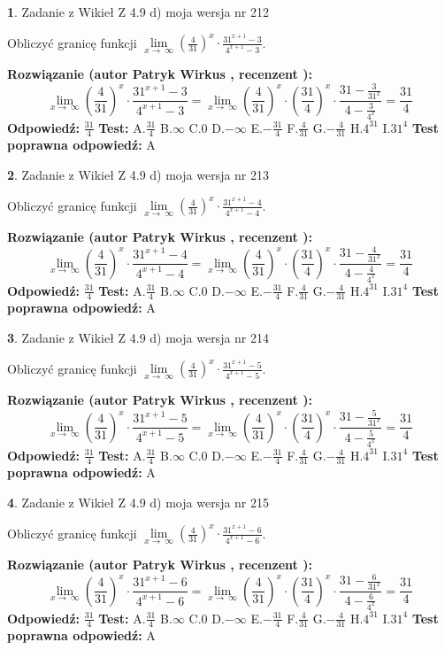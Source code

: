 \documentclass[12pt, a4paper]{article}
\theoremstyle{definition} %
\newtheorem{zad}{}
\newcommand{\zadStart}[1]{\begin{zad}#1\newline}
\newcommand{\zadStop}{\end{zad}}
\newcommand{\rozwStart}[2]{\noindent \textbf{Rozwiązanie (autor #1 , recenzent #2): }\newline}
\newcommand{\rozwStop}{\newline}
\newcommand{\odpStart}{\noindent \textbf{Odpowiedź:}\newline}
\newcommand{\odpStop}{\newline}
\newcommand{\testStart}{\noindent \textbf{Test:}\newline}
\newcommand{\testStop}{\newline}
\newcommand{\kluczStart}{\noindent \textbf{Test poprawna odpowiedź:}\newline}
\newcommand{\kluczStop}{\newline}
\begin{document}
\zadStart{Zadanie z Wikieł Z 4.9 d) moja wersja nr 212}


Obliczyć granicę funkcji  $\lim\limits_{x\to\ \infty}(\frac{4}{31})^{x}\cdot\frac{31^{x+1}-3}{4^{x+1}-3}$.
\zadStop
\rozwStart{Patryk Wirkus}{}
$$\lim\limits_{x\to\ \infty}(\frac{4}{31})^{x}\cdot\frac{31^{x+1}-3}{4^{x+1}-3}=\lim\limits_{x\to\ \infty}(\frac{4}{31})^{x}\cdot(\frac{31}{4})^{x} \cdot \frac{31-\frac{3}{31^{x}}}{4-\frac{3}{4^{x}}} = \frac{31}{4}$$
\rozwStop
\odpStart
$\frac{31}{4}$
\odpStop
\testStart
A.$\frac{31}{4}$ B.$\infty$ C.$0$ D.$-\infty$ E.$-\frac{31}{4}$
F.$\frac{4}{31}$ G.$-\frac{4}{31}$
H.$4^{31}$
I.$31^{4}$
\testStop
\kluczStart
A
\kluczStop



\zadStart{Zadanie z Wikieł Z 4.9 d) moja wersja nr 213}


Obliczyć granicę funkcji  $\lim\limits_{x\to\ \infty}(\frac{4}{31})^{x}\cdot\frac{31^{x+1}-4}{4^{x+1}-4}$.
\zadStop
\rozwStart{Patryk Wirkus}{}
$$\lim\limits_{x\to\ \infty}(\frac{4}{31})^{x}\cdot\frac{31^{x+1}-4}{4^{x+1}-4}=\lim\limits_{x\to\ \infty}(\frac{4}{31})^{x}\cdot(\frac{31}{4})^{x} \cdot \frac{31-\frac{4}{31^{x}}}{4-\frac{4}{4^{x}}} = \frac{31}{4}$$
\rozwStop
\odpStart
$\frac{31}{4}$
\odpStop
\testStart
A.$\frac{31}{4}$ B.$\infty$ C.$0$ D.$-\infty$ E.$-\frac{31}{4}$
F.$\frac{4}{31}$ G.$-\frac{4}{31}$
H.$4^{31}$
I.$31^{4}$
\testStop
\kluczStart
A
\kluczStop



\zadStart{Zadanie z Wikieł Z 4.9 d) moja wersja nr 214}


Obliczyć granicę funkcji  $\lim\limits_{x\to\ \infty}(\frac{4}{31})^{x}\cdot\frac{31^{x+1}-5}{4^{x+1}-5}$.
\zadStop
\rozwStart{Patryk Wirkus}{}
$$\lim\limits_{x\to\ \infty}(\frac{4}{31})^{x}\cdot\frac{31^{x+1}-5}{4^{x+1}-5}=\lim\limits_{x\to\ \infty}(\frac{4}{31})^{x}\cdot(\frac{31}{4})^{x} \cdot \frac{31-\frac{5}{31^{x}}}{4-\frac{5}{4^{x}}} = \frac{31}{4}$$
\rozwStop
\odpStart
$\frac{31}{4}$
\odpStop
\testStart
A.$\frac{31}{4}$ B.$\infty$ C.$0$ D.$-\infty$ E.$-\frac{31}{4}$
F.$\frac{4}{31}$ G.$-\frac{4}{31}$
H.$4^{31}$
I.$31^{4}$
\testStop
\kluczStart
A
\kluczStop



\zadStart{Zadanie z Wikieł Z 4.9 d) moja wersja nr 215}


Obliczyć granicę funkcji  $\lim\limits_{x\to\ \infty}(\frac{4}{31})^{x}\cdot\frac{31^{x+1}-6}{4^{x+1}-6}$.
\zadStop
\rozwStart{Patryk Wirkus}{}
$$\lim\limits_{x\to\ \infty}(\frac{4}{31})^{x}\cdot\frac{31^{x+1}-6}{4^{x+1}-6}=\lim\limits_{x\to\ \infty}(\frac{4}{31})^{x}\cdot(\frac{31}{4})^{x} \cdot \frac{31-\frac{6}{31^{x}}}{4-\frac{6}{4^{x}}} = \frac{31}{4}$$
\rozwStop
\odpStart
$\frac{31}{4}$
\odpStop
\testStart
A.$\frac{31}{4}$ B.$\infty$ C.$0$ D.$-\infty$ E.$-\frac{31}{4}$
F.$\frac{4}{31}$ G.$-\frac{4}{31}$
H.$4^{31}$
I.$31^{4}$
\testStop
\kluczStart
A
\kluczStop
\end{document}
